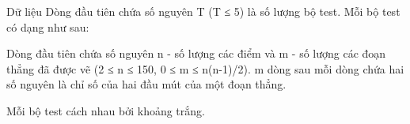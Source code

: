 Dữ liệu
Dòng đầu tiên chứa số nguyên T (T ≤ 5) là số lượng bộ test. Mỗi bộ test có dạng như sau:  

   Dòng đầu tiên chứa số nguyên n - số lượng các điểm và m - số lượng các đoạn thẳng đã được vẽ (2 ≤ n ≤ 150, 0 ≤ m ≤ n(n-1)/2). m dòng sau mỗi dòng chứa hai số nguyên là chỉ số của hai đầu mút của một đoạn thẳng.  

   Mỗi bộ test cách nhau bởi khoảng trắng.